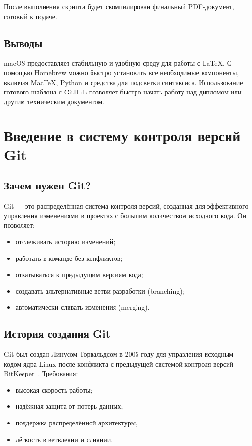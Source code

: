 \documentclass[a4paper,12pt]{report}
\begin{document}
После выполнения скрипта будет скомпилирован финальный PDF-документ, готовый к подаче.

\section{Выводы}

macOS предоставляет стабильную и удобную среду для работы с \LaTeX. С помощью Homebrew можно быстро установить все необходимые компоненты, включая MacTeX, Python и средства для подсветки синтаксиса. Использование готового шаблона с GitHub позволяет быстро начать работу над дипломом или другим техническим документом.


\chapter{Введение в систему контроля версий Git}\label{git_introduction}

\section{Зачем нужен Git?}
Git — это распределённая система контроля версий, созданная для эффективного управления изменениями в проектах с большим количеством исходного кода. Он позволяет:
\begin{itemize}[noitemsep]
    \item отслеживать историю изменений;
    \item работать в команде без конфликтов;
    \item откатываться к предыдущим версиям кода;
    \item создавать альтернативные ветви разработки (branching);
    \item автоматически сливать изменения (merging).
\end{itemize}

\section{История создания Git}
Git был создан Линусом Торвальдсом в 2005 году для управления исходным кодом ядра Linux после конфликта с предыдущей системой контроля версий — BitKeeper~\cite{progit_book}. Требования:
\begin{itemize}[noitemsep]
    \item высокая скорость работы;
    \item надёжная защита от потерь данных;
    \item поддержка распределённой архитектуры;
    \item лёгкость в ветвлении и слиянии.
\end{itemize}
\end{document}
